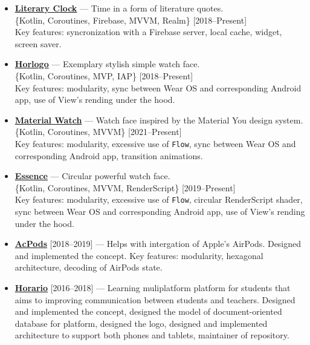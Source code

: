 \documentclass[a4paper]{article}
\begin{document}
\begin{itemize}
		\item \faAndroid \enskip \href{https://github.com/AChep/literaryclock}{\textbf{Literary Clock}} --- Time in a form of literature quotes. \\[0.2em]
		{\footnotesize \{Kotlin, Coroutines, Firebase, MVVM, Realm\} \hfill [2018--Present]} \\[0.2em]
		Key features: syncronization with a Firebase server, local cache, widget, screen saver.  
			
		\item \faAndroid \enskip \href{https://github.com/AChep/horlogo}{\textbf{Horlogo}} --- Exemplary stylish simple watch face. \\[0.2em]
		{\footnotesize \{Kotlin, Coroutines, MVP, IAP\} \hfill [2018--Present]} \\[0.2em]
		Key features: modularity, sync between Wear OS and corresponding Android app, use of View's rending under the hood.   
			
		\item \faAndroid \enskip \href{https://github.com/AChep/materialwatch}{\textbf{Material Watch}} --- Watch face inspired by the Material You design system. \\[0.2em]
		{\footnotesize \{Kotlin, Coroutines, MVVM\} \hfill [2021--Present]} \\[0.2em]
		Key features: modularity, excessive use of \texttt{Flow}, sync between Wear OS and corresponding Android app, transition animations.   
		
		\item \faAndroid \enskip \href{https://github.com/AChep/essence}{\textbf{Essence}} --- Circular powerful watch face. \\[0.2em]
		{\footnotesize \{Kotlin, Coroutines, MVVM, RenderScript\} \hfill [2019--Present]} \\[0.2em]
		Key features: modularity, excessive use of \texttt{Flow}, circular RenderScript shader, sync between Wear OS and corresponding Android app, use of View's rending under the hood.  
		
		\item {\footnotesize \faAndroid \enskip \href{https://github.com/AChep/acpods}{\textbf{AcPods}} [2018--2019] --- Helps with intergation of Apple's AirPods. Designed and implemented the concept. Key features: modularity, hexagonal architecture, decoding of AirPods state.}   
		
		\item {\footnotesize \faAndroid \enskip \href{http://artemchep.com/horario/}{\textbf{Horario}} [2016--2018] --- Learning muliplatform platform for students that aims to improving communication between students and teachers. Designed and implemented the concept, designed the model of document-oriented database for platform, designed the logo, designed and implemented architecture to support both phones and tablets, maintainer of repository.} 
		

\end{itemize}
\end{document}
